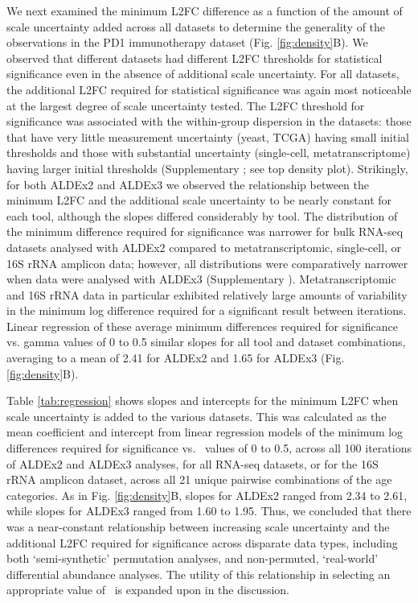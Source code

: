 \documentclass[10pt,letterpaper]{article}
\begin{document}
We next examined the minimum L2FC difference as a function of the amount of scale uncertainty added across all datasets to determine the generality of the observations in the PD1 immunotherapy dataset (Fig. \ref{fig:density}B). We observed that different datasets had different L2FC thresholds for statistical significance even in the absence of additional scale uncertainty. For all datasets, the additional L2FC required for statistical significance was again most noticeable at the largest degree of scale uncertainty tested. The L2FC threshold for significance was associated with the within-group dispersion in the datasets: those that have very little measurement uncertainty (yeast, TCGA) having small initial thresholds and those with substantial uncertainty (single-cell, metatranscriptome) having larger initial thresholds (Supplementary ; see top density plot). Strikingly, for both ALDEx2 and ALDEx3 we observed the relationship between the minimum L2FC and the additional scale uncertainty to be nearly constant for each tool, although the slopes differed considerably by tool. The distribution of the minimum difference required for significance was narrower for bulk RNA-seq datasets analysed with ALDEx2 compared to metatranscriptomic, single-cell, or 16S rRNA amplicon data; however, all distributions were comparatively narrower when data were analysed with ALDEx3 (Supplementary ). Metatranscriptomic and 16S rRNA data in particular exhibited relatively large amounts of variability in the minimum log difference required for a significant result between iterations. Linear regression of these average minimum differences required for significance vs. gamma values of 0 to 0.5 similar slopes for all tool and dataset combinations, averaging to a mean of 2.41 for ALDEx2 and 1.65 for ALDEx3 (Fig. \ref{fig:density}B).

Table \ref{tab:regression} shows slopes and intercepts for the minimum L2FC when scale uncertainty is added to the various datasets. This was calculated as the mean coefficient and intercept from linear regression models of the minimum log differences required for significance vs. \textgamma~values of 0 to 0.5, across all 100 iterations of ALDEx2 and ALDEx3 analyses, for all RNA-seq datasets, or for the 16S rRNA amplicon dataset, across all 21 unique pairwise combinations of the age categories. As in Fig. \ref{fig:density}B, slopes for ALDEx2 ranged from 2.34 to 2.61, while slopes for ALDEx3 ranged from 1.60 to 1.95. Thus, we concluded that there was a near-constant relationship between increasing scale uncertainty and the additional L2FC required for significance across disparate data types, including both `semi-synthetic' permutation analyses, and non-permuted, `real-world' differential abundance analyses. The utility of this relationship in selecting an appropriate value of \textgamma~is expanded upon in the discussion.
\end{document}
